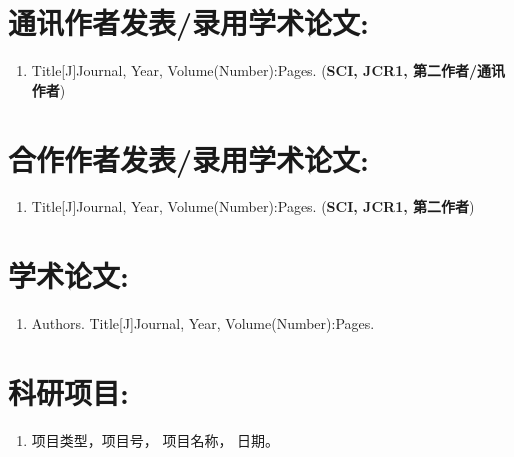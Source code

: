 {{    \section*{通讯作者发表/录用学术论文:}
    \begin{enumerate}[leftmargin=*]
        \item Title[J]Journal, Year, Volume(Number):Pages. (\textbf{SCI, JCR1, 第二作者/通讯作者})
    \end{enumerate}
    \section*{合作作者发表/录用学术论文:}
    \begin{enumerate}[leftmargin=*]
        \item Title[J]Journal, Year, Volume(Number):Pages. (\textbf{SCI, JCR1, 第二作者})
    \end{enumerate}
}{
    \section*{学术论文:}
    \begin{enumerate}[leftmargin=*]
        \item Authors. Title[J]Journal, Year, Volume(Number):Pages.
    \end{enumerate}
}

\section*{科研项目:}

\begin{enumerate}[leftmargin=*]
    \item 项目类型，项目号， 项目名称， 日期。
\end{enumerate}

\cleardoublepage[plain]%
}%
